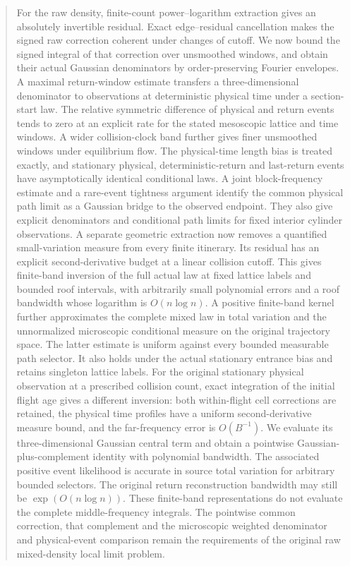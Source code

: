 \documentclass[11pt,reqno]{amsart}
\numberwithin{equation}{section}
\theoremstyle{definition}\newtheorem{definition}[theorem]{Definition}
\theoremstyle{remark}\newtheorem{remark}[theorem]{Remark}
\begin{document}
\begin{abstract}
For the raw density, finite-count power--logarithm extraction gives an
absolutely invertible residual. Exact edge--residual cancellation makes
the signed raw correction coherent under changes of cutoff. We now
bound the signed integral of that correction over unsmoothed windows,
and obtain their actual Gaussian denominators by order-preserving
Fourier envelopes. A maximal return-window estimate transfers a
three-dimensional denominator to observations at deterministic physical
time under a section-start law. The relative symmetric difference of
physical and return events tends to zero at an explicit rate for the
stated mesoscopic lattice and time windows. A wider collision-clock
band further gives finer unsmoothed windows under equilibrium flow.
The physical-time length bias is treated exactly, and stationary
physical, deterministic-return and last-return events have asymptotically
identical conditional laws. A joint block-frequency estimate and a
rare-event tightness argument identify the common physical path limit
as a Gaussian bridge to the observed endpoint. They also give explicit
denominators and conditional path limits for fixed interior cylinder
observations. A separate geometric extraction now removes a quantified
small-variation measure from every finite itinerary. Its residual has
an explicit second-derivative budget at a linear collision cutoff.
This gives finite-band inversion of the full actual law at fixed
lattice labels and bounded roof intervals, with arbitrarily small
polynomial errors and a roof bandwidth whose logarithm is $O(n\log n)$.
A positive finite-band kernel further approximates the complete mixed
law in total variation and the unnormalized microscopic conditional
measure on the original trajectory space. The latter estimate is uniform
against every bounded measurable path selector. It also holds under
the actual stationary entrance bias and retains singleton lattice labels.
For the original stationary physical observation at a prescribed collision
count, exact integration of the initial flight age gives a different
inversion: both within-flight cell corrections are retained, the physical
time profiles have a uniform second-derivative measure bound, and the
far-frequency error is $O(B^{-1})$. We evaluate its three-dimensional
Gaussian central term and obtain a pointwise Gaussian-plus-complement
identity with polynomial bandwidth. The associated positive event
likelihood is accurate in source total variation for arbitrary bounded
selectors. The original return reconstruction bandwidth may still be
$\exp(O(n\log n))$.
These finite-band representations do not evaluate the complete
middle-frequency integrals.
The pointwise common correction, that complement and the microscopic
weighted denominator and physical-event comparison remain the
requirements of the original raw mixed-density local limit problem.
\end{abstract}
\maketitle
\end{document}
